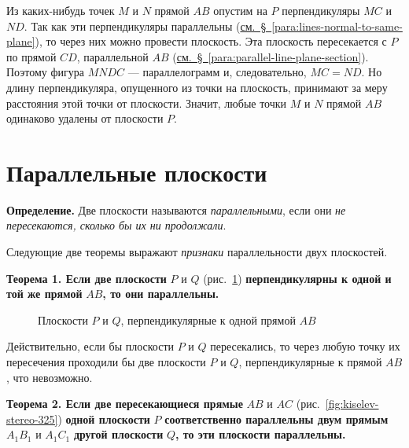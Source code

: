 Из каких-нибудь точек \(M\) и \(N\) прямой \(AB\) опустим на \(P\) перпендикуляры \(MC\) и \(ND\). Так как эти перпендикуляры параллельны (\hyperref[para:lines-normal-to-same-plane]{см.~§~\ref*{para:lines-normal-to-same-plane}}), то через них можно провести плоскость. Эта плоскость пересекается с \(P\) по прямой \(CD\), параллельной \(AB\) (\hyperref[para:parallel-line-plane-section]{см.~§~\ref*{para:parallel-line-plane-section}}). Поэтому фигура \(MNDC\) --- параллелограмм и, следовательно, \(MC=ND\). Но длину перпендикуляра, опущенного из точки на плоскость, принимают за меру расстояния этой точки от плоскости. Значит, любые точки \(M\) и \(N\) прямой \(AB\) одинаково удалены от плоскости \(P\).


\section*{Параллельные плоскости}

 \textbf{Определение.} Две плоскости называются \emph{параллельными}, если они \emph{не пересекаются, сколько бы их ни продолжали}.

Следующие две теоремы выражают \emph{признаки} параллельности двух плоскостей.

 \textbf{Теорема 1. Если две плоскости} \(P\) и \(Q\) (рис.~\ref{fig:kiselev-stereo-324}) \textbf{перпендикулярны к одной и той же прямой} \(AB\)\textbf{, то они параллельны.}

\begin{figure}[htbp]
    \centering
    \renewcommand{\thefigure}{324}
    \captionsetup{name=Рис.,labelsep=period}
    
    \caption{Плоскости \(P\) и \(Q\), перпендикулярные к одной прямой \(AB\)}\label{fig:kiselev-stereo-324}
\end{figure}

Действительно, если бы плоскости \(P\) и \(Q\) пересекались, то через любую точку их пересечения проходили бы две плоскости \(P\) и \(Q\), перпендикулярные к прямой \(AB\), что невозможно.

\label{thm:parallel-planes-two-lines}
\textbf{Теорема 2. Если две пересекающиеся прямые} \(AB\) и \(AC\) (рис.~\ref{fig:kiselev-stereo-325}) \textbf{одной плоскости} \(P\) \textbf{соответственно параллельны двум прямым} \(A_1B_1\) и \(A_1C_1\) \textbf{другой плоскости} \(Q\)\textbf{, то эти плоскости параллельны.}

